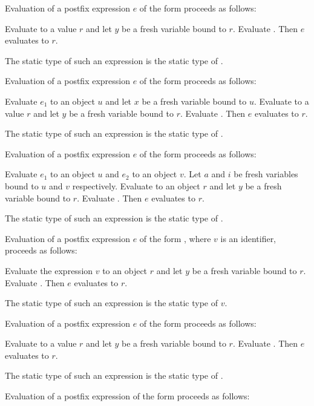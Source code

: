 \documentclass{article}
\begin{document}
\LMHash{}
Evaluation of a postfix expression $e$ of the form 
proceeds as follows:

\LMHash{}
Evaluate  to a value $r$
and let $y$ be a fresh variable bound to $r$.
Evaluate .
Then $e$ evaluates to $r$.

\LMHash{}
The static type of such an expression is the static type of .

\LMHash{}
Evaluation of a postfix expression $e$ of the form 
proceeds as follows:

\LMHash{}
Evaluate $e_1$ to an object $u$ and let $x$ be a fresh variable bound to $u$.
Evaluate  to a value $r$
and let $y$ be a fresh variable bound to $r$.
Evaluate .
Then $e$ evaluates to $r$.

\LMHash{}
The static type of such an expression is the static type of .

\LMHash{}
Evaluation of a postfix expression $e$ of the form 
proceeds as follows:

\LMHash{}
Evaluate $e_1$ to an object $u$ and $e_2$ to an object $v$.
Let $a$ and $i$ be fresh variables bound to $u$ and $v$ respectively.
Evaluate  to an object $r$
and let $y$ be a fresh variable bound to $r$.
Evaluate .
Then $e$ evaluates to $r$.

\LMHash{}
The static type of such an expression is the static type of .

\LMHash{}
Evaluation of a postfix expression $e$ of the form , where $v$ is an identifier, proceeds as follows:

\LMHash{}
Evaluate the expression $v$ to an object $r$
and let $y$ be a fresh variable bound to $r$.
Evaluate .
Then $e$ evaluates to $r$.

\LMHash{}
The static type of such an expression is the static type of $v$.

\LMHash{}
Evaluation of a postfix expression $e$ of the form 
proceeds as follows:

\LMHash{}
Evaluate  to a value $r$
and let $y$ be a fresh variable bound to $r$.
Evaluate .
Then $e$ evaluates to $r$.

\LMHash{}
The static type of such an expression is the static type of .

\LMHash{}
Evaluation of a postfix expression of the form 
proceeds as follows:
\end{document}
